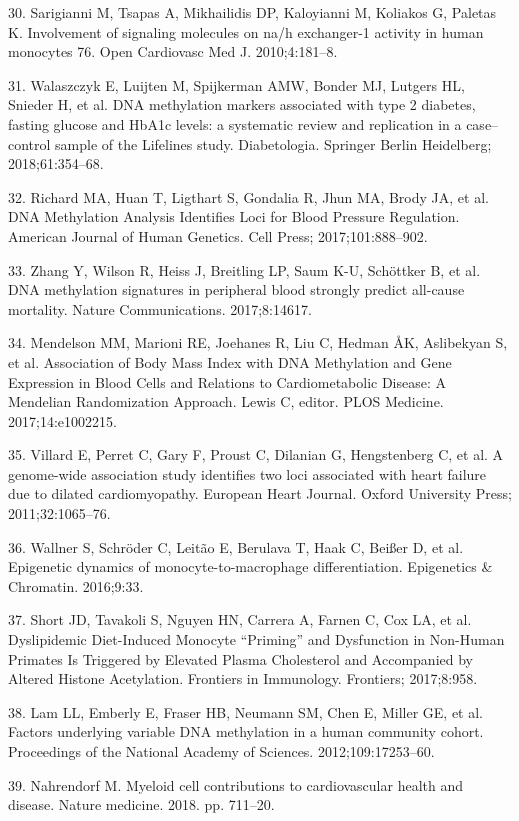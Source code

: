 \documentclass[]{bmcart}
\theoremstyle{definition}
\theoremstyle{definition}
\theoremstyle{definition}
\theoremstyle{remark}
\begin{document}
30. Sarigianni M, Tsapas A, Mikhailidis DP, Kaloyianni M, Koliakos G,
Paletas K. Involvement of signaling molecules on na/h exchanger-1
activity in human monocytes 76. Open Cardiovasc Med J. 2010;4:181--8.

31. Walaszczyk E, Luijten M, Spijkerman AMW, Bonder MJ, Lutgers HL,
Snieder H, et al. DNA methylation markers associated with type 2
diabetes, fasting glucose and HbA1c levels: a systematic review and
replication in a case--control sample of the Lifelines study.
Diabetologia. Springer Berlin Heidelberg; 2018;61:354--68.

32. Richard MA, Huan T, Ligthart S, Gondalia R, Jhun MA, Brody JA, et
al. DNA Methylation Analysis Identifies Loci for Blood Pressure
Regulation. American Journal of Human Genetics. Cell Press;
2017;101:888--902.

33. Zhang Y, Wilson R, Heiss J, Breitling LP, Saum K-U, Sch{ö}ttker B,
et al. DNA methylation signatures in peripheral blood strongly predict
all-cause mortality. Nature Communications. 2017;8:14617.

34. Mendelson MM, Marioni RE, Joehanes R, Liu C, Hedman ÅK, Aslibekyan
S, et al. Association of Body Mass Index with DNA Methylation and Gene
Expression in Blood Cells and Relations to Cardiometabolic Disease: A
Mendelian Randomization Approach. Lewis C, editor. PLOS Medicine.
2017;14:e1002215.

35. Villard E, Perret C, Gary F, Proust C, Dilanian G, Hengstenberg C,
et al. A genome-wide association study identifies two loci associated
with heart failure due to dilated cardiomyopathy. European Heart
Journal. Oxford University Press; 2011;32:1065--76.

36. Wallner S, Schr{ö}der C, Leit{ã}o E, Berulava T, Haak C, Bei{ß}er D,
et al. Epigenetic dynamics of monocyte-to-macrophage differentiation.
Epigenetics \& Chromatin. 2016;9:33.

37. Short JD, Tavakoli S, Nguyen HN, Carrera A, Farnen C, Cox LA, et al.
Dyslipidemic Diet-Induced Monocyte ``Priming'' and Dysfunction in
Non-Human Primates Is Triggered by Elevated Plasma Cholesterol and
Accompanied by Altered Histone Acetylation. Frontiers in Immunology.
Frontiers; 2017;8:958.

38. Lam LL, Emberly E, Fraser HB, Neumann SM, Chen E, Miller GE, et al.
Factors underlying variable DNA methylation in a human community cohort.
Proceedings of the National Academy of Sciences. 2012;109:17253--60.

39. Nahrendorf M. Myeloid cell contributions to cardiovascular health
and disease. Nature medicine. 2018. pp. 711--20.
\end{document}
